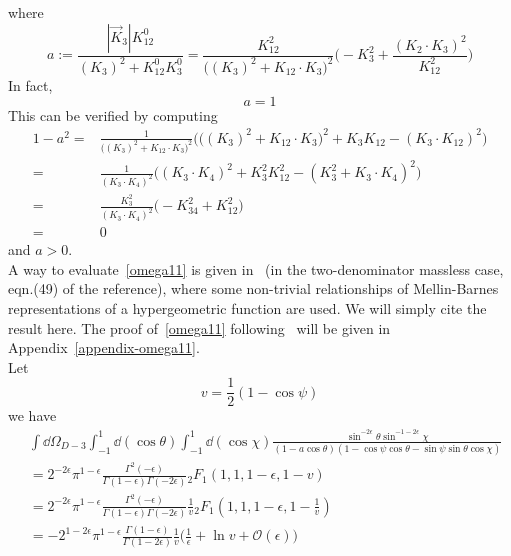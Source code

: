 where 
\begin{equation*}
a := \frac{|\vec{K}_3|K_{12}^0}{(K_3)^2 + K_{12}^0 K_3^0}
= \frac{K_{12}^2}{\big((K_3)^2 + K_{12}\cdot K_3\big)^2}\Big( -K_3^2 + \frac{(K_2\cdot K_3)^2}{K_{12}^2}\Big)
\end{equation*}
In fact, 
\begin{equation*}
a = 1
\end{equation*}
This can be verified by computing
\begin{equation*}
\begin{split}
1-a^2 = &
\frac{1}{\big((K_3)^2 + K_{12}\cdot K_3\big)^2}
\Big( \big( (K_3)^2 + K_{12}\cdot K_3 \big)^2 + K_3K_{12} - (K_3\cdot K_{12})^2
\Big)
\\
= &
\frac{1}{(K_3\cdot K_4)^2} \Big( (K_3\cdot K_4)^2 + K_3^2K_{12}^2 - (K_3^2 + K_3\cdot K_4)^2 \Big)
\\
= &
\frac{K_3^2}{(K_3\cdot K_4)^2}\Big(-K_{34}^2 + K_{12}^2\Big)
\\
= & 0
\end{split}
\end{equation*}
and $a>0$.
\\
A way to evaluate~\cref{omega11} is given in~\cite{Somogyi:2011ir} (in the two-denominator massless case, eqn.(49) of the reference), where some non-trivial relationships of Mellin-Barnes representations of a hypergeometric function are used.
We will simply cite the result here.
The proof of~\cref{omega11} following~\cite{Somogyi:2011ir} will be given in Appendix~\ref{appendix-omega11}.
\\
Let 
\begin{equation*}
v = \frac{1}{2}(1-\cos\psi)
\end{equation*}
we have
\begin{equation}\label{omega11}
\begin{split}
& \int \dd \Omega_{D-3}
\int_{-1}^1 \dd(\cos\theta)\int_{-1}^1\dd(\cos \chi)\frac{\sin^{-2\epsilon}\theta \sin^{-1-2\epsilon}\chi}{(1-a\cos\theta)(1-\cos\psi\cos\theta  - \sin\psi\sin\theta\cos\chi)}
\\
& = 
2^{-2\epsilon}\pi^{1-\epsilon}\frac{\Gamma^2(-\epsilon)}{\Gamma(1-\epsilon)\Gamma(-2\epsilon)}{}_2F_1(1,1,1-\epsilon, 1-v)
\\
& = 
2^{-2\epsilon}\pi^{1-\epsilon}\frac{\Gamma^2(-\epsilon)}{\Gamma(1-\epsilon)\Gamma(-2\epsilon)} \frac{1}{v}{}_2F_1(1,1,1-\epsilon, 1-\frac{1}{v})
\\
& = 
-2^{1-2\epsilon}\pi^{1-\epsilon} \frac{\Gamma(1-\epsilon)}{\Gamma(1-2\epsilon)}\frac{1}{v}\Big(\frac{1}{\epsilon}
+\ln v + \mathcal{O}(\epsilon)\Big)
\end{split}
\end{equation}
